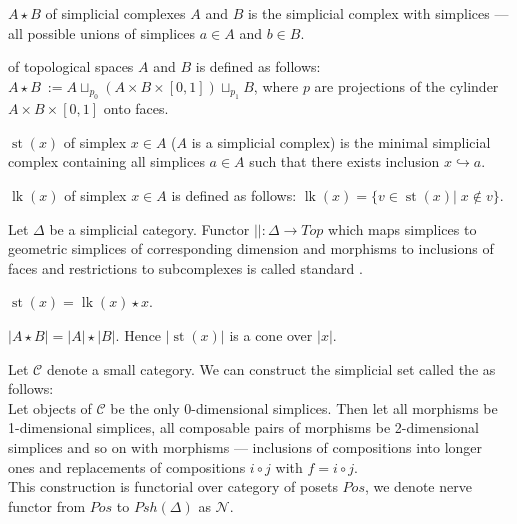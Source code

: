 \begin{definition}
   $A \star B$ of simplicial complexes $A$ and $B$ is the simplicial complex with simplices --- all possible unions of simplices $a \in A$ and $b \in B$.
\end{definition}

\begin{definition}
   of topological spaces $A$ and $B$ is defined as follows: $A \star B\ := A \sqcup_{p_0} (A \times B \times [0,1]) \sqcup_{p_1} B$, where $p$ are projections of the cylinder $A \times B \times [0,1]$ onto faces.
\end{definition}

\begin{definition}
   $\operatorname{st}(x)$ of simplex $x \in A$ ($A$ is a simplicial complex) is the minimal simplicial complex containing all simplices $a \in A$ such that there exists inclusion $x \hookrightarrow a$.
\end{definition}

\begin{definition}
   $\operatorname{lk}(x)$ of simplex $x \in A$ is defined as follows: $\operatorname{lk}(x) = \{v \in \operatorname{st}(x)|\; x \not\in v\}$.
\end{definition}

\begin{definition}
  Let $\Delta$ be a simplicial category. Functor $\left|\right| : \Delta \to Top$ which maps simplices to geometric simplices of corresponding dimension and morphisms to inclusions of faces and restrictions to subcomplexes is called standard .
\end{definition}

\begin{proposition}
  $\operatorname{st}(x) = \operatorname{lk}(x) \star x$.
\end{proposition}

\begin{proposition}
  $\left|A \star B\right| = \left|A\right| \star \left|B\right|$. Hence $\left|\operatorname{st}(x)\right|$ is a cone over $\left|x\right|$.
\end{proposition}

Let $\mathcal{C}$ denote a small category. We can construct the simplicial set called the  as follows:\\
Let objects of $\mathcal{C}$ be the only 0-dimensional simplices. Then let all morphisms be 1-dimensional simplices, all composable pairs of morphisms be 2-dimensional simplices and so on with morphisms --- inclusions of compositions into longer ones and replacements of compositions $i \circ j$ with $f = i \circ j$.\\
This construction is functorial over category of posets $Pos$, we denote nerve functor from $Pos$ to $Psh(\Delta)$ as $\mathcal{N}$.

